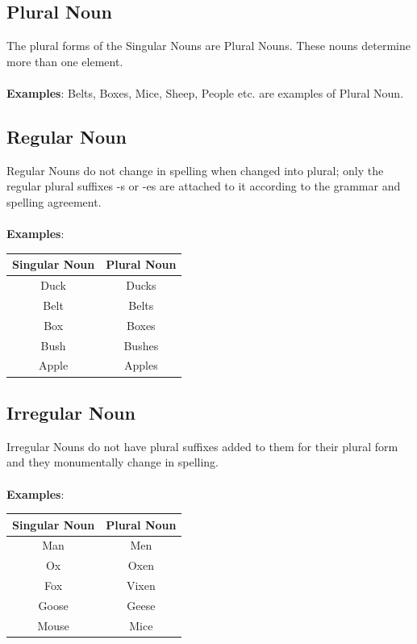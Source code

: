 \subsection{Plural Noun}
The plural forms of the Singular Nouns are Plural Nouns. These nouns determine more than one element.\\\\
\textbf{Examples}: Belts, Boxes, Mice, Sheep, People etc. are examples of Plural Noun.


\newpage
\subsection{Regular Noun}
Regular Nouns do not change in spelling when changed into plural; only the regular plural suffixes -s or -es are attached to it according to the grammar and spelling agreement.\\\\
\textbf{Examples}:
\begin{tabular}{|c|c|}\hline
    Singular Noun & Plural Noun \\\hline
    Duck          & Ducks       \\\hline
    Belt          & Belts       \\\hline
    Box           & Boxes       \\\hline
    Bush          & Bushes      \\\hline
    Apple         & Apples      \\\hline
\end{tabular}

\subsection{Irregular Noun}
Irregular Nouns do not have plural suffixes added to them for their plural form and they monumentally change in spelling.\\\\
\textbf{Examples}:
\begin{tabular}{|c|c|}\hline
    Singular Noun & Plural Noun \\\hline
    Man           & Men         \\\hline
    Ox            & Oxen        \\\hline
    Fox           & Vixen       \\\hline
    Goose         & Geese       \\\hline
    Mouse         & Mice        \\\hline
\end{tabular}

